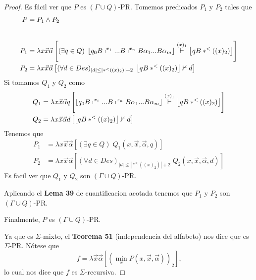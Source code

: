 \begin{theorem}
\begin{proof}
    Es fácil ver que $P$ es $(\Gamma \cup Q)$-PR.
    Tomemos predicados $P_1$ y $P_2$ tales que
    \begin{align*}
      P   &=  P_1 \land P_2 \\[20pt]
      P_1 &=  \lambda x \vec{x} \vec{\alpha}
              \left[
                (\exists q\in Q)\;
                \left\lfloor q_{0}B\shortmid ^{x_{1}}...B\shortmid ^{x_{n}}B\alpha _{1}...B\alpha _{m}\right\rfloor
                \overset{(x)_{1}}{\vdash }
                \left\lfloor qB\ast ^{< }((x)_{2})\right\rfloor
              \right] \\
      P_2 &=  \lambda x \vec{x} \vec{\alpha}
              \left[
                (\forall d\in Des)
                _{\left\vert d\right\vert \leq \left\vert \ast ^{< }((x)_{2})\right\vert +2}\;
                \left\lfloor qB\ast ^{< }((x)_{2})\right\rfloor \nvdash d
              \right]
    \end{align*}
    Si tomamos $Q_1$ y $Q_2$ como
    \begin{align*}
      Q_1 &=  \lambda x \vec{x} \vec{\alpha} q
              \left[
                \left\lfloor q_{0}B\shortmid ^{x_{1}}...B\shortmid ^{x_{n}}B\alpha _{1}...B\alpha _{m}\right\rfloor
                \overset{(x)_{1}}{\vdash }
                \left\lfloor qB\ast ^{< }((x)_{2})\right\rfloor
              \right] \\
      Q_2 &=  \lambda x \vec{x} \vec{\alpha} d
              \left[
                \left\lfloor qB\ast ^{< }((x)_{2})\right\rfloor \nvdash d
              \right]
    \end{align*}
    Tenemos que
    \begin{align*}
      P_1 &=  \lambda x \vec{x} \vec{\alpha}
              \left[
                (\exists q\in Q)\;
                Q_1(x, \vec{x}, \vec{\alpha}, q)
              \right] \\
      P_2 &=  \lambda x \vec{x} \vec{\alpha}
              \left[
                (\forall d\in Des)
                _{\left\vert d\right\vert \leq \left\vert \ast ^{< }((x)_{2})\right\vert +2}\;
                Q_2(x, \vec{x}, \vec{\alpha}, d)
              \right]
    \end{align*}
    Es facil ver que $Q_1$ y $Q_2$ son $(\Gamma \cup Q)$-PR.

    \noindent Aplicando el \textbf{Lema 39} de cuantificacion acotada tenemos que $P_1$ y $P_2$ son
    $(\Gamma \cup Q)$-PR.

    \noindent Finalmente, $P$ es $(\Gamma \cup Q)$-PR.

    \noindent Ya que es $\Sigma $-mixto, el \textbf{Teorema 51} (independencia del alfabeto) nos dice que es
    $\Sigma $-PR. Nótese que
    \[
      f=\lambda \vec{x}\vec{\alpha}\left[ \left( \min_{x}P(x,\vec{x},\vec{\alpha} )\right) _{2}\right] \text{,}
    \]
    lo cual nos dice que $f$ es $\Sigma $-recursiva.
  \end{proof}
  \end{theorem}

